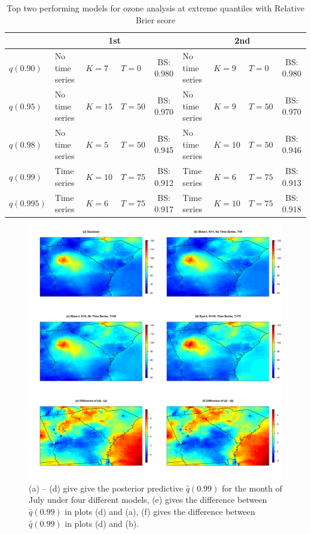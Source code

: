 \documentclass[11pt]{article}
\begin{document}
\begin{table}
  \small
  \caption{Top two performing models for ozone analysis at extreme quantiles with Relative Brier score}
  \label{tbl:ozoneresults}
  \centering
  \begin{tabular}{|l|l l l c|l l l c|}
    \cline{2-9}
    \multicolumn{1}{c|}{}  & \multicolumn{4}{c|}{1st} & \multicolumn{4}{c|}{2nd} \\
    \hline
    $q(0.90)$  & No time series & $K=7$  & $T=0$  & BS: 0.980 &
                 No time series & $K=9$  & $T=0$  & BS: 0.980 \\
    $q(0.95)$  & No time series & $K=15$ & $T=50$ & BS: 0.970 &
                 No time series & $K=9$  & $T=50$ & BS: 0.970\\
    $q(0.98)$  & No time series & $K=5$  & $T=50$ & BS: 0.945 &
                 No time series & $K=10$ & $T=50$ & BS: 0.946\\
    $q(0.99)$  & Time series    & $K=10$ & $T=75$ & BS: 0.912 &
                 Time series    & $K=6$  & $T=75$ & BS: 0.913\\
    $q(0.995)$ & Time series    & $K=6$  & $T=75$ & BS: 0.917 &
                 Time series    & $K=10$ & $T=75$ & BS: 0.918\\
    \hline
  \end{tabular}
\end{table}

\begin{figure}
  \includegraphics[width=\linewidth]{plots/q99-ozone.pdf}
  \caption{(a) -- (d) give give the posterior predictive $\widehat{q}(0.99)$ for the month of July under four different models, (e) gives the difference between $\widehat{q}(0.99)$ in plots (d) and (a), (f) gives the difference between $\widehat{q}(0.99)$ in plots (d) and (b).}
  \label{fig:ozoneq99}
\end{figure}
\end{document}
